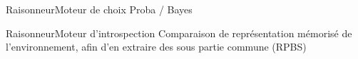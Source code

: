 \begin{frame}{Raisonneur}{Moteur de choix}
Proba / Bayes
\end{frame}

\begin{frame}{Raisonneur}{Moteur d'introspection}
Comparaison de représentation mémorisé de l'environnement, afin d'en extraire des sous partie commune (RPBS)
\end{frame}